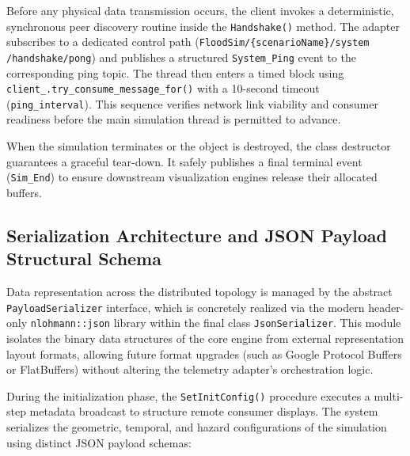 Before any physical data transmission occurs, the client invokes a deterministic, synchronous peer discovery routine inside the 
\texttt{Handshake()} method. The adapter subscribes to a dedicated control path (\texttt{FloodSim/\{scenarioName\}/system \\ /handshake/pong}) 
and publishes a structured \texttt{System\_Ping} event to the corresponding ping 
topic. The thread then enters a timed block using \\ \texttt{client\_.\-try\_consume\_message\_for()} with a 10-second timeout 
(\texttt{ping\_interval}). This sequence verifies network link viability and 
consumer readiness before the main simulation thread is permitted to advance.

When the simulation terminates or the object is destroyed, the class destructor guarantees a graceful tear-down. It safely publishes a 
final terminal event (\texttt{Sim\_End}) to ensure downstream visualization engines release their allocated 
buffers.

\subsection{Serialization Architecture and JSON Payload Structural Schema}
\label{subsec:serialization_architecture}

Data representation across the distributed topology is managed by the abstract \\ \texttt{PayloadSerializer} interface, which is concretely 
realized via the modern header-only \texttt{nlohmann::json} library within the final class \texttt{JsonSerializer}. This module isolates 
the binary data structures of the core engine from external representation layout formats, allowing future format upgrades (such as 
Google Protocol Buffers or FlatBuffers) without altering the telemetry adapter's orchestration logic.

During the initialization phase, the \texttt{SetInitConfig()} procedure executes a multi-step metadata broadcast to structure remote 
consumer displays. The system serializes the geometric, temporal, and hazard configurations of the simulation using distinct JSON payload 
schemas:

